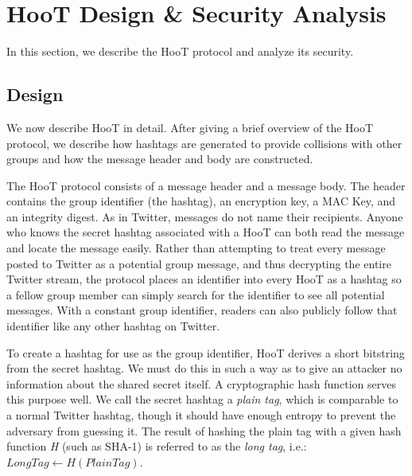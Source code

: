 \section{HooT Design \& Security Analysis}
\label{sec:design-sec}

In this section, we describe the HooT protocol and analyze its security.

\subsection{Design}
\label{sec:design}

We now describe HooT in detail. After giving a brief overview of the
HooT protocol, we describe how hashtags are generated to provide
collisions with other groups and how the message header and body are
constructed. 

 The HooT protocol consists of a message
header and a message body. The header contains the group identifier (the
hashtag), an encryption key, a MAC Key, and an integrity digest. As in
Twitter, messages do not name their recipients. Anyone who knows the
secret hashtag associated with a HooT can both read the message and
locate the message easily. Rather than attempting to treat every message
posted to Twitter as a potential group message, and thus decrypting the
entire Twitter stream, the protocol places an identifier into every HooT
as a hashtag so a fellow group member can simply search for the
identifier to see all potential messages. With a constant group
identifier, readers can also publicly follow that identifier like any
other hashtag on Twitter.

 To create a hashtag for use as the group
identifier, HooT derives a short bitstring from the secret hashtag. We
must do this in such a way as to give an attacker no information about
the shared secret itself. A cryptographic hash function serves this
purpose well.
We call the secret hashtag a \textit{plain tag}, which is comparable to
a normal Twitter hashtag, though it should have enough entropy to
prevent the adversary from guessing it. The result of hashing the plain
tag with a given hash function \textit{H} (such as SHA-1) is referred to
as the \textit{long tag}, i.e.:
%
$\mathit{LongTag} \leftarrow H\left(\mathit{PlainTag}\right)$.

